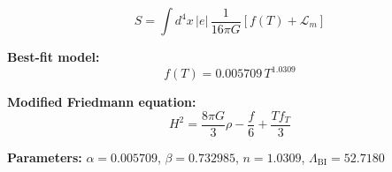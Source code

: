 
\begin{equation}
  S = \int d^4x \, |e| \, \frac{1}{16\pi G} \left[ f(T) + \mathcal{L}_m \right]
\end{equation}

\textbf{Best-fit model:}
\begin{equation}
  f(T) = 0.005709 \, T^{1.0309}
\end{equation}

\textbf{Modified Friedmann equation:}
\begin{equation}
  H^2 = \frac{8\pi G}{3} \rho - \frac{f}{6} + \frac{T f_T}{3}
\end{equation}

\textbf{Parameters:}
$\alpha = 0.005709$, \quad
$\beta = 0.732985$, \quad
$n = 1.0309$, \quad
$\Lambda_{\text{BI}} = 52.7180$